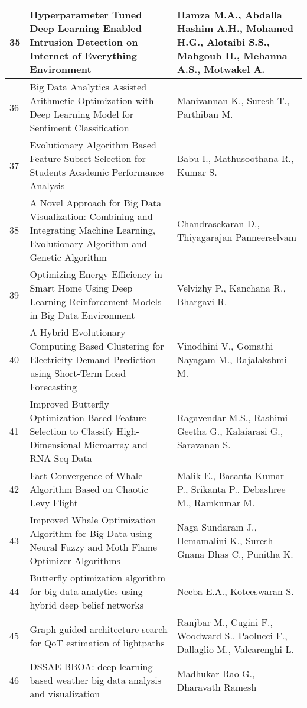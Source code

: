 \begin{landscape}
\begin{longtable}{|p{0.5cm}|p{9cm}|p{7cm}|}
    \hline
    35 & Hyperparameter Tuned Deep Learning Enabled Intrusion Detection on Internet of Everything Environment & Hamza M.A., Abdalla Hashim A.H., Mohamed H.G., Alotaibi S.S., Mahgoub H., Mehanna A.S., Motwakel A. \\
    \hline
    36 & Big Data Analytics Assisted Arithmetic Optimization with Deep Learning Model for Sentiment Classification & Manivannan K., Suresh T., Parthiban M. \\
    \hline
    37 & Evolutionary Algorithm Based Feature Subset Selection for Students Academic Performance Analysis & Babu I., Mathusoothana R., Kumar S. \\
    \hline
    38 & A Novel Approach for Big Data Visualization: Combining and Integrating Machine Learning, Evolutionary Algorithm and Genetic Algorithm & Chandrasekaran D., Thiyagarajan Panneerselvam \\
    \hline
    39 & Optimizing Energy Efficiency in Smart Home Using Deep Learning Reinforcement Models in Big Data Environment & Velvizhy P., Kanchana R., Bhargavi R. \\
    \hline
    40 & A Hybrid Evolutionary Computing Based Clustering for Electricity Demand Prediction using Short-Term Load Forecasting & Vinodhini V., Gomathi Nayagam M., Rajalakshmi M. \\
    \hline
    41 & Improved Butterfly Optimization-Based Feature Selection to Classify High-Dimensional Microarray and RNA-Seq Data & Ragavendar M.S., Rashimi Geetha G., Kalaiarasi G., Saravanan S. \\
    \hline
    42 & Fast Convergence of Whale Algorithm Based on Chaotic Levy Flight & Malik E., Basanta Kumar P., Srikanta P., Debashree M., Ramkumar M. \\
    \hline
    43 & Improved Whale Optimization Algorithm for Big Data using Neural Fuzzy and Moth Flame Optimizer Algorithms & Naga Sundaram J., Hemamalini K., Suresh Gnana Dhas C., Punitha K. \\
    \hline
    44 & Butterfly optimization algorithm for big data analytics using hybrid deep belief networks & Neeba E.A., Koteeswaran S. \\
    \hline
    45 & Graph-guided architecture search for QoT estimation of lightpaths & Ranjbar M., Cugini F., Woodward S., Paolucci F., Dallaglio M., Valcarenghi L. \\
    \hline
    46 & DSSAE-BBOA: deep learning-based weather big data analysis and visualization & Madhukar Rao G., Dharavath Ramesh \\

\end{longtable}
\end{landscape}
